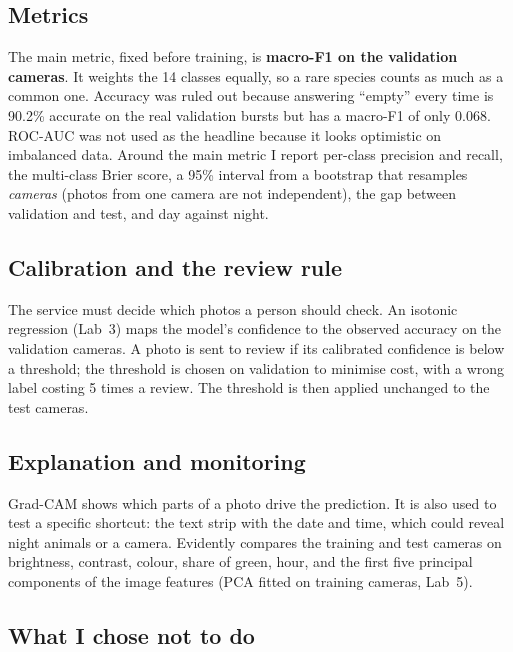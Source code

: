 \documentclass[11pt,a4paper]{article}
\begin{document}
\subsection{Metrics}
The main metric, fixed before training, is \textbf{macro-F1 on the validation cameras}. It weights the 14
classes equally, so a rare species counts as much as a common one. Accuracy was ruled out because
answering ``empty'' every time is 90.2\% accurate on the real validation bursts but has a macro-F1 of
only 0.068. ROC-AUC was not used as the headline because it looks optimistic on imbalanced data. Around
the main metric I report per-class precision and recall, the multi-class Brier score, a 95\% interval from a
bootstrap that resamples \emph{cameras} (photos from one camera are not independent), the gap between
validation and test, and day against night.

\subsection{Calibration and the review rule}
The service must decide which photos a person should check. An isotonic regression (Lab~3) maps the
model's confidence to the observed accuracy on the validation cameras. A photo is sent to review if its
calibrated confidence is below a threshold; the threshold is chosen on validation to minimise cost, with a
wrong label costing 5 times a review. The threshold is then applied unchanged to the test cameras.

\subsection{Explanation and monitoring}
Grad-CAM \cite{selvaraju2017} shows which parts of a photo drive the prediction. It is also used to test a
specific shortcut: the text strip with the date and time, which could reveal night animals or a camera.
Evidently compares the training and test cameras on brightness, contrast, colour, share of green, hour,
and the first five principal components of the image features (PCA fitted on training cameras, Lab~5).

\subsection{What I chose not to do}
\end{document}
